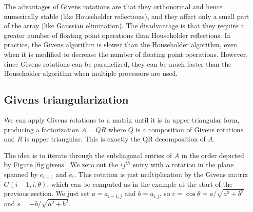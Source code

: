 The advantages of Givens rotations are that they orthonormal and hence numerically stable (like Householder reflections), and they affect only a small part of the array (like Gaussian elimination).
The disadvantage is that they require a greater number of floating point operations than Householder reflections.
In practice, the Givens algorithm is slower than the Householder algorithm, even when it is modified to decrease the number of floating point operations. 
However, since Givens rotations can be parallelized, they can be much faster than the Householder algorithm when multiple processors are used.




\subsection*{Givens triangularization}
We can apply Givens rotations to a matrix until it is in upper triangular form, producing a factorization $A = QR$ where $Q$ is a composition of Givens rotations and $R$ is upper triangular.
This is exactly the QR decomposition of $A$.

The idea is to iterate through the subdiagonal entries of $A$ in the order depicted by Figure \ref{fig:givens}. 
We zero out the $ij^{th}$ entry with a rotation in the plane spanned by $e_{i-1}$ and $e_i$. 
This rotation is just multiplication by the Givens matrix $G(i-1,i,\theta)$, which can be computed as in the example at the start of the previous section. 
We just set $a=a_{i-1,j}$ and $b=a_{i,j}$, so $c = \cos \theta = a/\sqrt{a^2+b^2}$ and $s = -b/\sqrt{a^2+b^2}$.

